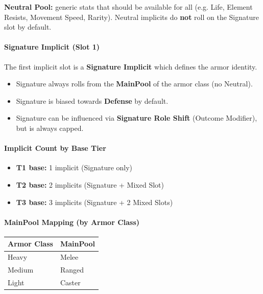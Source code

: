\noindent
\textbf{Neutral Pool:} generic stats that should be available for all (e.g. Life, Element Resists, Movement Speed, Rarity).
Neutral implicits do \textbf{not} roll on the Signature slot by default.

\paragraph{Signature Implicit (Slot 1)}
The first implicit slot is a \textbf{Signature Implicit} which defines the armor identity.
\begin{itemize}
	\item Signature always rolls from the \textbf{MainPool} of the armor class (no Neutral).
	\item Signature is biased towards \textbf{Defense} by default.
	\item Signature can be influenced via \textbf{Signature Role Shift} (Outcome Modifier), but is always capped.
\end{itemize}

\paragraph{Implicit Count by Base Tier}
\begin{itemize}
	\item \textbf{T1 base:} 1 implicit (Signature only)
	\item \textbf{T2 base:} 2 implicits (Signature + Mixed Slot)
	\item \textbf{T3 base:} 3 implicits (Signature + 2 Mixed Slots)
\end{itemize}

\paragraph{MainPool Mapping (by Armor Class)}
\begin{center}
	\begin{tabular}{|l|l|}
		\hline
		\textbf{Armor Class} & \textbf{MainPool} \\
		\hline
		Heavy & Melee \\
		Medium & Ranged \\
		Light & Caster \\
		\hline
	\end{tabular}
\end{center}

